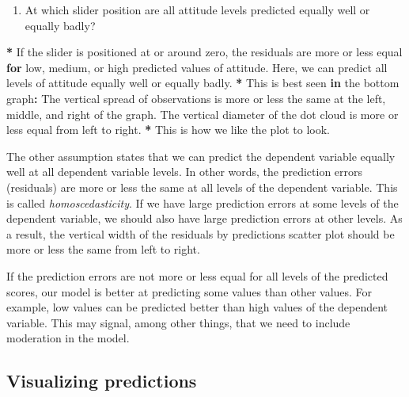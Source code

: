\documentclass[a4paper]{book}
\newenvironment{Shaded}{\begin{snugshade}}{\end{snugshade}}
\newcommand{\StringTok}[1]{\textcolor[rgb]{0.00,0.00,0.00}{#1}}
\newcommand{\ControlFlowTok}[1]{\textcolor[rgb]{0.00,0.00,0.00}{\textbf{#1}}}
\newcommand{\OperatorTok}[1]{\textcolor[rgb]{0.00,0.00,0.00}{\textbf{#1}}}
\newcommand{\NormalTok}[1]{#1}
\providecommand{\tightlist}{%
  \setlength{\itemsep}{0pt}\setlength{\parskip}{0pt}}
\theoremstyle{definition}
\theoremstyle{definition}
\theoremstyle{definition}
\theoremstyle{remark}
\begin{document}
\begin{enumerate}
\def\labelenumi{\arabic{enumi}.}
\setcounter{enumi}{2}
\tightlist
\item
  At which slider position are all attitude levels predicted equally
  well or equally badly?
\end{enumerate}

\begin{Shaded}
\begin{Highlighting}[]
\OperatorTok{*}\StringTok{ }\NormalTok{If the slider is positioned at or around zero, the residuals are more or}
\NormalTok{less equal }\ControlFlowTok{for}\NormalTok{ low, medium, or high predicted values of attitude.}
\NormalTok{Here, we can predict all levels of attitude equally well or equally badly.}
\OperatorTok{*}\StringTok{ }\NormalTok{This is best seen }\ControlFlowTok{in}\NormalTok{ the bottom graph}\OperatorTok{:}\StringTok{ }\NormalTok{The vertical spread of observations}
\NormalTok{is more or less the same at the left, middle, and right of the graph. The}
\NormalTok{vertical diameter of the dot cloud is more or less equal from left to right.}
\OperatorTok{*}\StringTok{ }\NormalTok{This is how we like the plot to look.}
\end{Highlighting}
\end{Shaded}

The other assumption states that we can predict the dependent variable
equally well at all dependent variable levels. In other words, the
prediction errors (residuals) are more or less the same at all levels of
the dependent variable. This is called \emph{homoscedasticity}. If we
have large prediction errors at some levels of the dependent variable,
we should also have large prediction errors at other levels. As a
result, the vertical width of the residuals by predictions scatter plot
should be more or less the same from left to right.

If the prediction errors are not more or less equal for all levels of
the predicted scores, our model is better at predicting some values than
other values. For example, low values can be predicted better than high
values of the dependent variable. This may signal, among other things,
that we need to include moderation in the model.

\subsection{Visualizing predictions}\label{visualizing-predictions}
\end{document}
